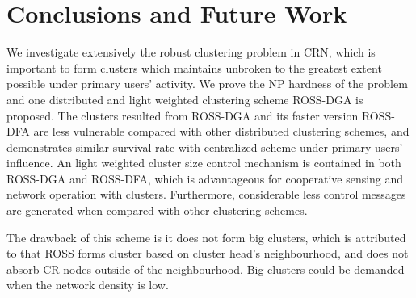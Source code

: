 \begin{comment}
\begin{figure}[t]
\begin{center}

\subfigure[100 PRns, varying CRns]{\label{result2:1}\texttt{[image: CR\_ICC\_3curves.pdf]}}
\subfigure[100 PRns, varying CRns]{\label{result2:2}\texttt{[image: CR\_OCC\_3curves.pdf]}}
 \end{center}
\caption[]{Connectivity robustness of ICCs and OCCs with varying density of CR nodes.} %
\label{result2}
\end{figure}

\begin{figure}[ht!]
\begin{center}
\subfigure[100 CRns, 100 PRns]{\label{result3:1}\texttt{[image: distribution\_1\_matlab.pdf]}}
\subfigure[200 CRns, 100 PRns]{\label{result3:2}\texttt{[image: distribution\_2\_matlab.pdf]}}
 \end{center}
\caption[]{Distribution of cluster sizes for two fixed scenarios.} %
\label{result3}
\end{figure}	

\end{comment}


\section{Conclusions and Future Work}
\label{conclusion}
We investigate extensively the robust clustering problem in CRN, which is important to form clusters which maintains unbroken to the greatest extent possible under primary users' activity.
We prove the NP hardness of the problem and one distributed and light weighted clustering scheme ROSS-DGA is proposed.
The clusters resulted from ROSS-DGA and its faster version ROSS-DFA are less vulnerable compared with other distributed clustering schemes, and demonstrates similar survival rate with centralized scheme under primary users' influence.
An light weighted cluster size control mechanism is contained in both ROSS-DGA and ROSS-DFA, which is advantageous for cooperative sensing and network operation with clusters.
Furthermore, considerable less control messages are generated when compared with other clustering schemes.

The drawback of this scheme is it does not form big clusters, which is attributed to that ROSS forms cluster based on cluster head's neighbourhood, and does not absorb CR nodes outside of the neighbourhood.
Big clusters could be demanded when the network density is low.

